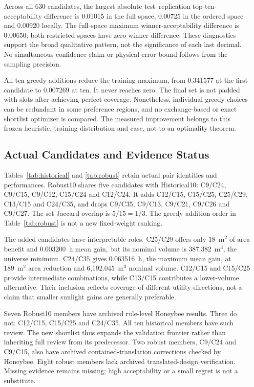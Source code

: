 \documentclass{llncs}
\begin{document}


Across all 630 candidates, the largest absolute test--replication top-ten-acceptability difference is 0.01015 in the full space, 0.00725 in the ordered space and 0.00920 locally. The full-space maximum winner-acceptability difference is 0.00650; both restricted spaces have zero winner difference. These diagnostics support the broad qualitative pattern, not the significance of each last decimal. No simultaneous confidence claim or physical error bound follows from the sampling precision.

All ten greedy additions reduce the training maximum, from 0.341577 at the first candidate to 0.007269 at ten. It never reaches zero. The final set is not padded with slots after achieving perfect coverage. Nonetheless, individual greedy choices can be redundant in some preference regions, and no exchange-based or exact shortlist optimizer is compared. The measured improvement belongs to this frozen heuristic, training distribution and case, not to an optimality theorem.

\subsection{Actual Candidates and Evidence Status}


Tables~\ref{tab:historical} and \ref{tab:robust} retain actual pair identities and performances. Robust10 shares five candidates with Historical10: C9/C24, C9/C15, C9/C12, C15/C24 and C12/C24. It adds C12/C15, C15/C25, C25/C29, C13/C15 and C24/C35, and drops C9/C35, C9/C13, C9/C21, C9/C26 and C9/C27. The set Jaccard overlap is $5/15=1/3$. The greedy addition order in Table~\ref{tab:robust} is not a new fixed-weight ranking.

The added candidates have interpretable roles. C25/C29 offers only 18~m$^2$ of area benefit and 0.003200~h mean gain, but its nominal volume is 387.382~m$^3$, the universe minimum. C24/C35 gives 0.063516~h, the maximum mean gain, at 189~m$^2$ area reduction and 6,192.045~m$^3$ nominal volume. C12/C15 and C15/C25 provide intermediate combinations, while C13/C15 contributes a lower-volume alternative. Their inclusion reflects coverage of different utility directions, not a claim that smaller sunlight gains are generally preferable.

Seven Robust10 members have archived rule-level Honeybee results. Three do not: C12/C15, C15/C25 and C24/C35. All ten historical members have such review. The new shortlist thus expands the validation frontier rather than inheriting full review from its predecessor. Two robust members, C9/C24 and C9/C15, also have archived contained-translation corrections checked by Honeybee. Eight robust members lack archived translated-design verification. Missing evidence remains missing; high acceptability or a small regret is not a substitute.
\end{document}
